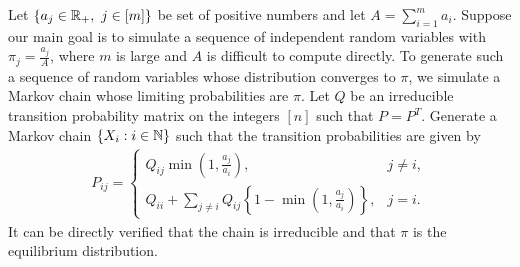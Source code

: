 \documentclass[a4paper,10pt,english]{article}
\begin{document}
\begin{shaded*}
\begin{exmp*} Let $\{a_j \in \mathbb{R}_+,~ j \in [m]\}$ be set of positive numbers and let $A=\sum_{i=1}^{m}a_i$. 
Suppose our main goal is to simulate a sequence of independent random variables with $\pi_j = \frac{a_j}{A}$, where  $m$ is large and $A$ is difficult to compute directly. 
To generate such a sequence of random variables whose distribution converges to $\pi$, we simulate a Markov chain whose limiting probabilities are $\pi$. 
Let $Q$ be an irreducible transition probability matrix on the integers $[n]$ such that $P = P^T$. 
Generate a Markov chain $\{X_i: i \in \mathbb{N}\}$ such that the transition probabilities are given by 
\begin{align*}
P_{ij} = \begin{cases}
       Q_{ij}\min\left(1,\frac{a_j}{a_i}\right), & j \neq i,\\
       Q_{ii}+\sum_{j \neq i}Q_{ij}\left\{1-\min\left(1,\frac{a_j}{a_i}\right)\right\}, & j = i.
     \end{cases}
\end{align*} 
It can be directly verified that the chain is irreducible and that $\pi$ is the equilibrium distribution.
\end{exmp*}
\end{shaded*}


\end{document}
